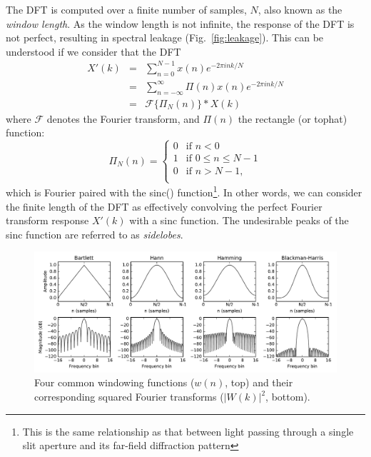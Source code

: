 \documentclass{ws-rv961x669}
\begin{document}
The DFT is computed over a finite number of samples, $N$, also known as the \emph{window length}. As the window length is not infinite, the response of the DFT is not perfect, resulting in spectral leakage (Fig.~\ref{fig:leakage}). This can be understood if we consider that the DFT
\begin{eqnarray}
X'(k) & = & \sum_{n=0}^{N-1}x(n)e^{-2\pi ink/N} \\
     & = &  \sum_{n=-\infty}^{\infty} \Pi (n)x(n)e^{-2\pi ink/N}\\
     & = & \mathcal{F}\{\Pi_N(n)\}*X(k) \label{eq:dft_tophat}
\end{eqnarray}
where $\mathcal{F}$ denotes the Fourier transform, and $\Pi(n)$ the rectangle (or tophat) function:
\begin{equation}
\Pi_N(n) = \begin{cases}
	0 & \mbox{if } n < 0 \\
	1 & \mbox{if } 0 \leq n \leq N-1 \\
	0 & \mbox{if } n > N-1, \\
\end{cases}	
\end{equation}
which is Fourier paired with the sinc() function\footnote{This is the same relationship as that between light passing through a single slit aperture and its far-field diffraction pattern}. In other words, we can consider the finite length of the DFT as effectively convolving the perfect Fourier transform response $X'(k)$ with a sinc function. The undesirable peaks of the sinc function are referred to as \emph{sidelobes}.

\begin{figure}[t]
 \centering
 \includegraphics[width=\textwidth]{./figures/window_fns}
 \caption{Four common windowing functions ($w(n)$, top) and their corresponding squared Fourier transforms ($|W(k)|^2$, bottom). %
 \label{fig:window_fns}}
\end{figure}
\end{document}
